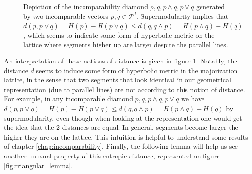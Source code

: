 \begin{figure}[h!]
    \centering
    \caption{Depiction of the incomparability diamond $p, q, p \wedge q, p \vee q$ generated by two incomparable vectors $p, q \in \mathcal{P}^d$. Supermodularity implies that $d(p, p\vee q) = H(p) - H(p \vee q) \leq d(q, q \wedge p) = H(p \wedge q) - H(q)$, which seems to indicate some form of hyperbolic metric on the lattice where segments higher up are larger despite the parallel lines.} 
    \label{fig:hyperbolic_geometry}
\end{figure}

An interpretation of these notions of distance is given in figure \ref{fig:hyperbolic_geometry}. Notably, the distance $d$ seems to induce some form of hyperbolic metric in the majorization lattice, in the sense that two segments that look identical in our geometrical representation (due to parallel lines) are not according to this notion of distance. For example, in any incomparable diamond $p, q, p \wedge q, p \vee q$ we have $d(p, p\vee q) = H(p) - H(p \vee q) \leq d(q, q \wedge p) = H(p \wedge q) - H(q)$ by supermodularity, even though when looking at the representation one would get the idea that the 2 distances are equal. In general, segments become larger the higher they are on the lattice. This intuition is helpful to understand some results of chapter \ref{chap:incomparability}. Finally, the following lemma will help us see another unusual property of this entropic distance, represented on figure \ref{fig:triangular_lemma}.


